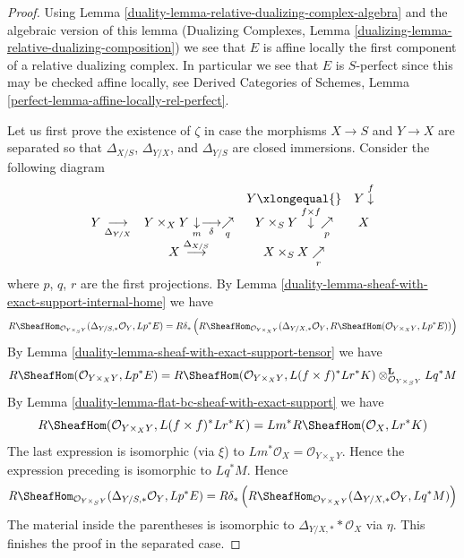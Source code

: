 \begin{proof}

Using Lemma \ref{duality-lemma-relative-dualizing-complex-algebra}
and the algebraic version of this lemma (Dualizing Complexes, Lemma
\ref{dualizing-lemma-relative-dualizing-composition})
we see that $E$
is affine locally the first component of a relative dualizing complex.
In particular we see that $E$
is $S$-perfect since this may be checked affine locally, see
Derived Categories of Schemes, Lemma
\ref{perfect-lemma-affine-locally-rel-perfect}.

\medskip\noindent
Let us first prove the existence of $\zeta$ in case the
morphisms $X \to S$ and $Y \to X$ are separated so that
$\Delta_{X/S}$, $\Delta_{Y/X}$, and $\Delta_{Y/S}$
are closed immersions. Consider the following diagram
$$
\begin{array}{cccc} &  & Y \xlongequal{} & Y \overset{f}{\downarrow} \\ Y \underset{\Delta_{Y/X}}{\longrightarrow} & Y \times_X Y \underset{m}{\downarrow}\underset{\delta}{\longrightarrow}\underset{q}{\nearrow} & Y \times_S Y \overset{f \times f}{\downarrow}\underset{p}{\nearrow} & X \\  & X \overset{\Delta_{X/S}}{\longrightarrow} & X \times_S X \underset{r}{\nearrow} & \end{array}
$$
where $p$, $q$, $r$ are the first projections.
By Lemma \ref{duality-lemma-sheaf-with-exact-support-internal-home}
we have
$$
R\SheafHom_{\mathcal{O}_{Y \times_S Y}}(
\Delta_{Y/S, *}\mathcal{O}_Y, Lp^*E) =
R\delta_*\left(R\SheafHom_{\mathcal{O}_{Y \times_X Y}}(
\Delta_{Y/X, *}\mathcal{O}_Y,
R\SheafHom(\mathcal{O}_{Y \times_X Y}, Lp^*E))\right)
$$
By Lemma \ref{duality-lemma-sheaf-with-exact-support-tensor} we have
$$
R\SheafHom(\mathcal{O}_{Y \times_X Y}, Lp^*E) =
R\SheafHom(\mathcal{O}_{Y \times_X Y}, L(f \times f)^*Lr^*K)
\otimes_{\mathcal{O}_{Y \times_S Y}}^\mathbf{L} Lq^*M
$$
By Lemma \ref{duality-lemma-flat-bc-sheaf-with-exact-support} we have
$$
R\SheafHom(\mathcal{O}_{Y \times_X Y}, L(f \times f)^*Lr^*K) =
Lm^*R\SheafHom(\mathcal{O}_X, Lr^*K)
$$
The last expression is isomorphic (via $\xi$) to
$Lm^*\mathcal{O}_X = \mathcal{O}_{Y \times_X Y}$.
Hence the expression preceding is isomorphic to
$Lq^*M$. Hence
$$
R\SheafHom_{\mathcal{O}_{Y \times_S Y}}(
\Delta_{Y/S, *}\mathcal{O}_Y, Lp^*E) =
R\delta_*\left(R\SheafHom_{\mathcal{O}_{Y \times_X Y}}(
\Delta_{Y/X, *}\mathcal{O}_Y, Lq^*M)\right)
$$
The material inside the parentheses is isomorphic to
$\Delta_{Y/X, *}*\mathcal{O}_X$ via $\eta$.
This finishes the proof in the separated case.


\end{proof}
